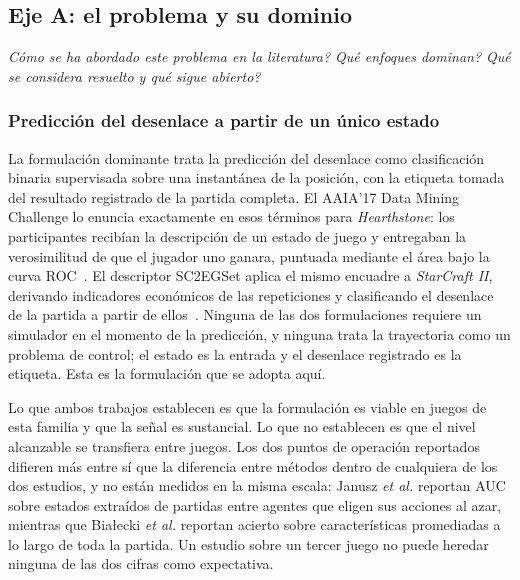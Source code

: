 \documentclass[conference]{IEEEtran}
\begin{document}
\subsection{Eje A: el problema y su dominio}
\label{subsec:axisa}
\emph{\textquestiondown C\'omo se ha abordado este problema en la literatura?
\textquestiondown Qu\'e enfoques dominan? \textquestiondown Qu\'e se considera resuelto y qu\'e sigue
abierto?}

\subsubsection{Predicci\'on del desenlace a partir de un \'unico estado}
La formulaci\'on dominante trata la predicci\'on del desenlace como
clasificaci\'on binaria supervisada sobre una instant\'anea de la
posici\'on, con la etiqueta tomada del resultado registrado de la partida
completa. El AAIA'17 Data Mining Challenge lo enuncia exactamente en esos
t\'erminos para \emph{Hearthstone}: los participantes recib\'ian la
descripci\'on de un estado de juego y entregaban la verosimilitud de que el
jugador uno ganara, puntuada mediante el \'area bajo la curva
ROC~\cite{janusz_hearthstone_2017}. El descriptor SC2EGSet aplica el mismo
encuadre a \emph{StarCraft II}, derivando indicadores econ\'omicos de las
repeticiones y clasificando el desenlace de la partida a partir de
ellos~\cite{bialecki_sc2egset_2023}. Ninguna de las dos formulaciones
requiere un simulador en el momento de la predicci\'on, y ninguna trata la
trayectoria como un problema de control; el estado es la entrada y el
desenlace registrado es la etiqueta. Esta es la formulaci\'on que se adopta
aqu\'i.

Lo que ambos trabajos establecen es que la formulaci\'on es viable en juegos
de esta familia y que la se\~nal es sustancial. Lo que no establecen es que
el nivel alcanzable se transfiera entre juegos. Los dos puntos de
operaci\'on reportados difieren m\'as entre s\'i que la diferencia entre
m\'etodos dentro de cualquiera de los dos estudios, y no est\'an medidos en
la misma escala: Janusz \textit{et al.} reportan AUC sobre estados
extra\'idos de partidas entre agentes que eligen sus acciones al azar,
mientras que Bia\l ecki \textit{et al.} reportan acierto sobre
caracter\'isticas promediadas a lo largo de toda la partida. Un estudio
sobre un tercer juego no puede heredar ninguna de las dos cifras como
expectativa.
\end{document}
